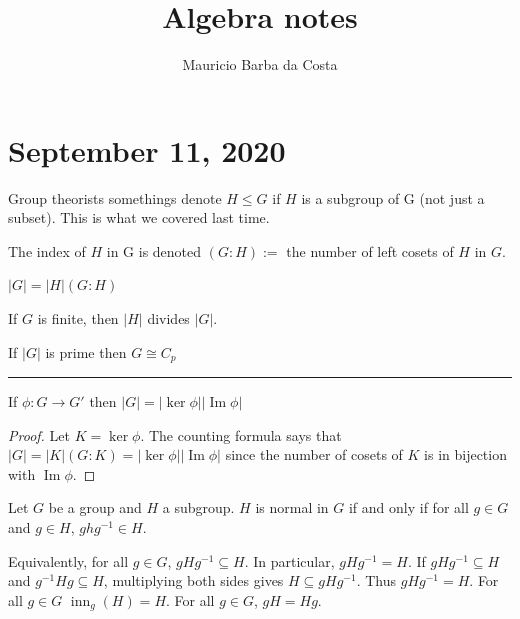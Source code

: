 \documentclass{article}
\title{Algebra notes}
\author{Mauricio Barba da Costa}
\renewcommand{\Im}{\operatorname{Im}}
\newcommand{\ra}[1][]{\xrightarrow{#1}}
\DeclareMathOperator{\inn}{inn}
\begin{document}
\maketitle

\section{September 11, 2020}
Group theorists somethings denote $H\leq G$ if $H$ is a subgroup of G (not just a subset). This is what we covered last time.
\begin{definition}
    The index of $H$ in G is denoted $(G:H):=$ the number of left cosets of $H$ in $G$.
\end{definition}
\begin{theorem}
    $|G|=|H|(G:H)$
\end{theorem}
\begin{corollary}
If $G$ is finite, then $|H|$ divides $|G|$.
\end{corollary}
\begin{corollary}
If $|G|$ is prime then $G\cong C_p$
\end{corollary}
\hrule
\begin{corollary}
If $\phi:G\ra{} G'$ then $|G|=|\ker\phi||\Im\phi|$
\end{corollary}
\begin{proof}
Let $K=\ker\phi$. The counting formula says that $|G|=|K|(G:K)=|\ker\phi||\Im\phi|$ since the number of cosets of $K$ is in bijection with $\Im\phi$.
\end{proof}
\begin{definition}
    Let $G$ be a group and $H$ a subgroup. $H$ is normal in $G$ if and only if for all $g\in G$ and $g\in H$, $ghg^{-1}\in H$.
\end{definition}
Equivalently, for all $g\in G$, $gHg^{-1}\subseteq H$. In particular, $gHg^{-1}=H$. If $gHg^{-1}\subseteq H$ and $g^{-1}Hg\subseteq H$, multiplying both sides gives $H\subseteq gHg^{-1}$. Thus $gHg^{-1}=H$. For all $g\in G$ $\inn_g(H)=H$. For all $g\in G$, $gH=Hg$.
\end{document}
